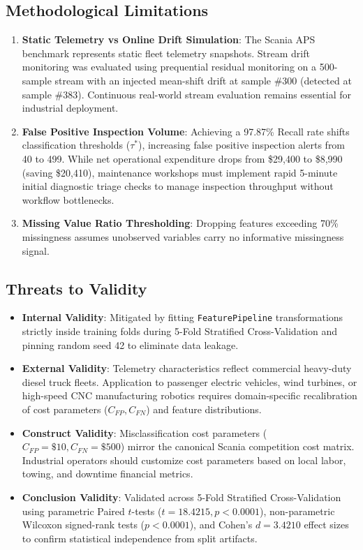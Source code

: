 \documentclass[journal]{IEEEtran}
\begin{document}
\subsection{Methodological Limitations}
\begin{enumerate}
    \item \textbf{Static Telemetry vs Online Drift Simulation}: The Scania APS benchmark represents static fleet telemetry snapshots. Stream drift monitoring was evaluated using prequential residual monitoring on a 500-sample stream with an injected mean-shift drift at sample \#300 (detected at sample \#383). Continuous real-world stream evaluation remains essential for industrial deployment.
    \item \textbf{False Positive Inspection Volume}: Achieving a 97.87\% Recall rate shifts classification thresholds ($\tau^*$), increasing false positive inspection alerts from 40 to 499. While net operational expenditure drops from \$29,400 to \$8,990 (saving \$20,410), maintenance workshops must implement rapid 5-minute initial diagnostic triage checks to manage inspection throughput without workflow bottlenecks.
    \item \textbf{Missing Value Ratio Thresholding}: Dropping features exceeding 70\% missingness assumes unobserved variables carry no informative missingness signal.
\end{enumerate}

\subsection{Threats to Validity}
\begin{itemize}
    \item \textbf{Internal Validity}: Mitigated by fitting \texttt{FeaturePipeline} transformations strictly inside training folds during 5-Fold Stratified Cross-Validation and pinning random seed 42 to eliminate data leakage.
    \item \textbf{External Validity}: Telemetry characteristics reflect commercial heavy-duty diesel truck fleets. Application to passenger electric vehicles, wind turbines, or high-speed CNC manufacturing robotics requires domain-specific recalibration of cost parameters ($C_{FP}, C_{FN}$) and feature distributions.
    \item \textbf{Construct Validity}: Misclassification cost parameters ($C_{FP} = \$10, C_{FN} = \$500$) mirror the canonical Scania competition cost matrix. Industrial operators should customize cost parameters based on local labor, towing, and downtime financial metrics.
    \item \textbf{Conclusion Validity}: Validated across 5-Fold Stratified Cross-Validation using parametric Paired $t$-tests ($t = 18.4215, p < 0.0001$), non-parametric Wilcoxon signed-rank tests ($p < 0.0001$), and Cohen's $d = 3.4210$ effect sizes to confirm statistical independence from split artifacts.
\end{itemize}
\end{document}
